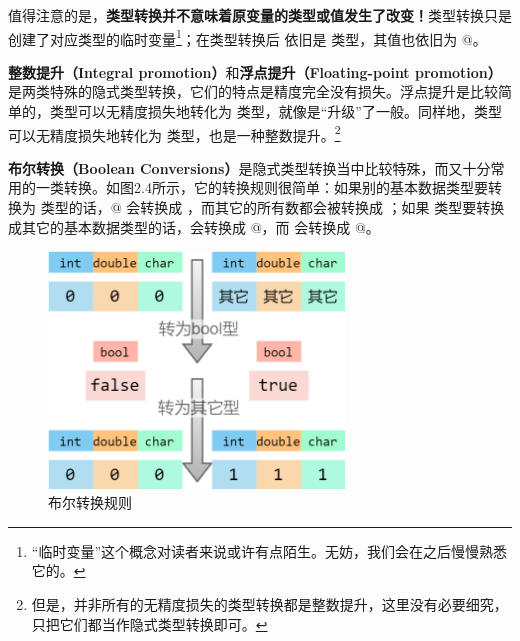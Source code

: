 值得注意的是，\textbf{类型转换并不意味着原变量的类型或值发生了改变！}类型转换只是创建了对应类型的临时变量\footnote{``临时变量''这个概念对读者来说或许有点陌生。无妨，我们会在之后慢慢熟悉它的。}；在类型转换后 \lstinline@d@ 依旧是 \lstinline@double@ 类型，其值也依旧为 @。\par
\textbf{整数提升（Integral promotion）}和\textbf{浮点提升（Floating-point promotion）}是两类特殊的隐式类型转换，它们的特点是精度完全没有损失。浮点提升是比较简单的，\lstinline@float@ 类型可以无精度损失地转化为 \lstinline@double@ 类型，就像是``升级''了一般。同样地，\lstinline@char@ 类型可以无精度损失地转化为 \lstinline@int@ 类型，也是一种整数提升。\footnote{但是，并非所有的无精度损失的类型转换都是整数提升，这里没有必要细究，只把它们都当作隐式类型转换即可。}\par
\label{con:boolean_conversions}
\textbf{布尔转换（Boolean Conversions）}是隐式类型转换当中比较特殊，而又十分常用的一类转换。如图2.4所示，它的转换规则很简单：如果别的基本数据类型要转换为 \lstinline@bool@ 类型的话，@ 会转换成 \lstinline@false@，而其它的所有数都会被转换成 \lstinline@true@；如果 \lstinline@bool@ 类型要转换成其它的基本数据类型的话，\lstinline@false@ 会转换成 @，而 \lstinline@true@ 会转换成 @。\par
\begin{figure}[htbp]
    \centering
    \includegraphics[width=0.7\textwidth]{../images/generalized_parts/02_boolean_conversion.png}
    \caption{布尔转换规则}
\end{figure}
